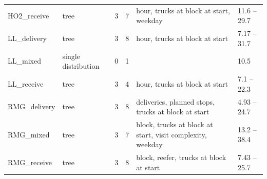 \begin{longtable}{L{3.5cm}L{1.5cm}rrL{3.4cm}L{1.6cm}}
HO2\_receive & tree & 3 & 7 & hour, trucks at block at start, weekday & 11.6 -- 29.7 \\
LL\_delivery & tree & 3 & 8 & hour, trucks at block at start & 7.17 -- 31.7 \\
LL\_mixed & single distribution & 0 & 1 &  & 10.5 \\
LL\_receive & tree & 3 & 4 & hour, trucks at block at start & 7.1 -- 22.3 \\
RMG\_delivery & tree & 3 & 8 & deliveries, planned stops, trucks at block at start & 4.93 -- 24.7 \\
RMG\_mixed & tree & 3 & 7 & block, trucks at block at start, visit complexity, weekday & 13.2 -- 38.4 \\
RMG\_receive & tree & 3 & 8 & block, reefer, trucks at block at start & 7.43 -- 25.7 \\
\end{longtable}
